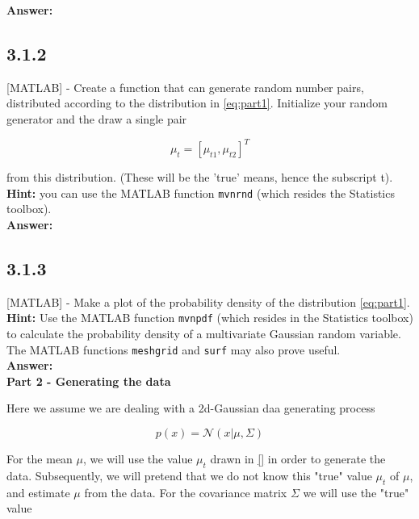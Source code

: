 \documentclass[a4paper]{article}
\begin{document}
\textbf{Answer:}\\



\subsection*{3.1.2}

[MATLAB] - Create a function that can generate random number pairs, distributed according to the distribution in \ref{eq:part1}. Initialize your random generator and the draw a single pair

\begin{equation}
	\mu_t = [\mu_{t1}, \mu_{t2}]^T
\end{equation}

from this distribution. (These will be the 'true' means, hence the subscript t).\\

\textbf{Hint:} you can use the MATLAB function \texttt{mvnrnd} (which resides the Statistics toolbox).\\

\textbf{Answer:}\\




\subsection*{3.1.3}

[MATLAB] - Make a plot of the probability density of the distribution \ref{eq:part1}.\\

\textbf{Hint:} Use the MATLAB function \texttt{mvnpdf} (which resides in the Statistics toolbox) to calculate the probability density of a multivariate Gaussian random variable. The MATLAB functions \texttt{meshgrid} and \texttt{surf} may also prove useful.\\


\textbf{Answer:}\\

\textbf{Part 2 - Generating the data}

Here we assume we are dealing with a 2d-Gaussian daa generating process

\begin{equation}
	p(x) = \mathcal{N}(x|\mu, \Sigma)
\end{equation}

For the mean $\mu$, we will use the value $\mu_t$ drawn in \ref{} in order to generate the data. Subsequently, we will pretend that we do not know this "true" value $\mu_t$ of $\mu$, and estimate $\mu$ from the data. For the covariance matrix $\Sigma$ we will use the "true" value
\end{document}
